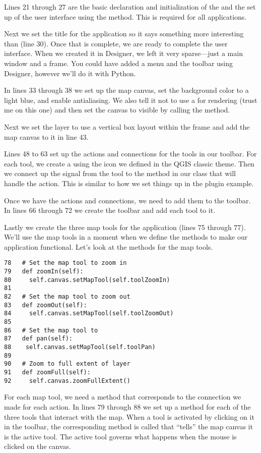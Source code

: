 Lines 21 through 27 are the basic declaration and initialization of the 
 and the set up of the user interface using the 
 method. This is required for all applications.

Next we set the title for the application so it says something more
interesting than  (line 30). Once that is
complete, we are ready to complete the user interface. When we created it in
Designer, we left it very sparse---just a main window and a frame. You could
have added a menu and the toolbar using Designer, however we'll do it with
Python.

In lines 33 through 38 we set up the map canvas, set the background color to a
light blue, and enable antialiasing.  We also tell it not to use a
 for rendering (trust me on this one) and then set the
canvas to visible by calling the  method.

Next we set the layer to use a vertical box layout within the frame and add
the map canvas to it in line 43.

Lines 48 to 63 set up the actions and connections for the tools in our
toolbar. For each tool, we create a  using the icon we
defined in the QGIS classic theme.  Then we connect up the
 signal from the tool to the method in our class that will
handle the action. This is similar to how we set things up in the plugin
example.

Once we have the actions and connections, we need to add them to the toolbar.
In lines 66 through 72 we create the toolbar and add each tool to it.

Lastly we create the three map tools for the application (lines 75 through
77). We'll use the map tools in a moment when we define the methods to make
our application functional. Let's look at the methods for the map tools.

\begin{verbatim}
78   # Set the map tool to zoom in
79   def zoomIn(self):
80     self.canvas.setMapTool(self.toolZoomIn)
81 
82   # Set the map tool to zoom out
83   def zoomOut(self):
84     self.canvas.setMapTool(self.toolZoomOut)
85 
86   # Set the map tool to 
87   def pan(self):
88    self.canvas.setMapTool(self.toolPan)
89 
90   # Zoom to full extent of layer
91   def zoomFull(self):
92     self.canvas.zoomFullExtent()
\end{verbatim}

For each map tool, we need a method that corresponds to the connection we made
for each action. In lines 79 through 88 we set up a method for each of the
  three tools that interact with the map. When a tool is activated by clicking
  on it in the toolbar, the corresponding method is called that ``tells'' the
  map canvas it is the active tool. The active tool governs what happens when
  the mouse is clicked on the canvas.

